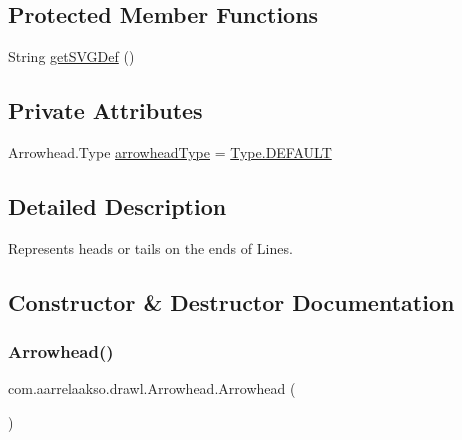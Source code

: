 \subsection*{Protected Member Functions}
\begin{DoxyCompactItemize}
\item 
String \hyperlink{classcom_1_1aarrelaakso_1_1drawl_1_1_arrowhead_a0094c4f48945d782b7e474b15ef06561}{get\+S\+V\+G\+Def} ()
\end{DoxyCompactItemize}
\subsection*{Private Attributes}
\begin{DoxyCompactItemize}
\item 
Arrowhead.\+Type \hyperlink{classcom_1_1aarrelaakso_1_1drawl_1_1_arrowhead_a72183bdf6672377d73b2d9810b6d0ed7}{arrowhead\+Type} = \hyperlink{enumcom_1_1aarrelaakso_1_1drawl_1_1_arrowhead_1_1_type_ae4c70d3cd0853637fba791f2bb29cd8e}{Type.\+D\+E\+F\+A\+U\+LT}
\end{DoxyCompactItemize}


\subsection{Detailed Description}
Represents heads or tails on the ends of Lines. 

\subsection{Constructor \& Destructor Documentation}
\mbox{\label{classcom_1_1aarrelaakso_1_1drawl_1_1_arrowhead_a866fb3900ad67226bad5962031cc7817}} 
\subsubsection{\texorpdfstring{Arrowhead()}{Arrowhead()}\hspace{0.1cm}{\footnotesize\ttfamily [1/2]}}
{\footnotesize\ttfamily com.\+aarrelaakso.\+drawl.\+Arrowhead.\+Arrowhead (\begin{DoxyParamCaption}{ }\end{DoxyParamCaption})}



